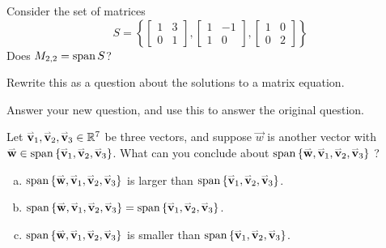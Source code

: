 \begin{activity}{5}
Consider the set of matrices
\[ S = \left\{
		\begin{bmatrix} 1 & 3 \\ 0 & 1 \end{bmatrix},
		\begin{bmatrix} 1 & -1 \\ 1 & 0 \end{bmatrix},
		\begin{bmatrix} 1 & 0 \\ 0 & 2 \end{bmatrix}
		\right\} \]
Does \(M_{2,2} = \vspan S\)?
	\begin{subactivity}Rewrite this as a question about the solutions to a matrix equation.
	\end{subactivity}
	\begin{subactivity}Answer your new question, and use this to answer the original question.
	\end{subactivity}
\end{activity}

\begin{activity}{5}
Let \(\vec{v}_1, \vec{v}_2, \vec{v}_3 \in \IR^7\) be three vectors, and suppose \(\vec{w}\) is another vector with \(\vec{w} \in \vspan \left\{ \vec{v}_1, \vec{v}_2, \vec{v}_3 \right\}\).  What can you conclude about \( \vspan \left\{ \vec{w}, \vec{v}_1, \vec{v}_2, \vec{v}_3 \right\} \) ?
\begin{enumerate}[(a)]
\item \( \vspan \left\{ \vec{w}, \vec{v}_1, \vec{v}_2, \vec{v}_3 \right\} \) is larger than \( \vspan \left\{ \vec{v}_1, \vec{v}_2, \vec{v}_3 \right\} \).
\item \( \vspan \left\{ \vec{w}, \vec{v}_1, \vec{v}_2, \vec{v}_3 \right\}  = \vspan \left\{ \vec{v}_1, \vec{v}_2, \vec{v}_3 \right\} \).
\item \( \vspan \left\{ \vec{w}, \vec{v}_1, \vec{v}_2, \vec{v}_3 \right\} \) is smaller than \( \vspan \left\{ \vec{v}_1, \vec{v}_2, \vec{v}_3 \right\} \).
\end{enumerate}
\end{activity}




